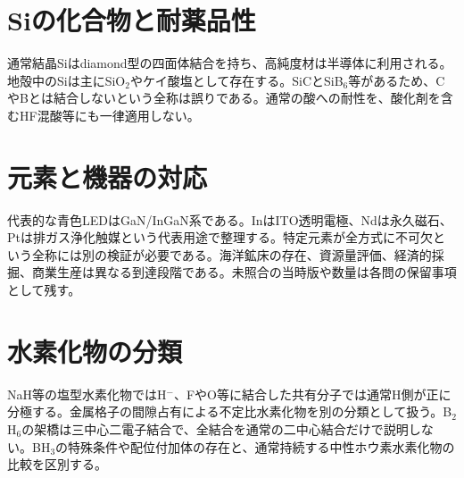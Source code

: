 \section{Siの化合物と耐薬品性}\label{theory:inorganic:silicon}
通常結晶Siはdiamond型の四面体結合を持ち、高純度材は半導体に利用される。地殻中のSiは主にSiO$_2$やケイ酸塩として存在する。SiCとSiB$_6$等があるため、CやBとは結合しないという全称は誤りである。通常の酸への耐性を、酸化剤を含むHF混酸等にも一律適用しない。\cite{inorganic_metalloid_ref,inorganic_sic,inorganic_sib6,inorganic_hf_etch}
\section{元素と機器の対応}\label{theory:inorganic:materials}
代表的な青色LEDはGaN/InGaN系である。InはITO透明電極、Ndは永久磁石、Ptは排ガス浄化触媒という代表用途で整理する。特定元素が全方式に不可欠という全称には別の検証が必要である。海洋鉱床の存在、資源量評価、経済的採掘、商業生産は異なる到達段階である。未照合の当時版や数量は各問の保留事項として残す。\cite{inorganic_blueled,inorganic_rareuses,inorganic_searesources}
\section{水素化物の分類}\label{theory:inorganic:hydride}
NaH等の塩型水素化物ではH$^-$、FやO等に結合した共有分子では通常H側が正に分極する。金属格子の間隙占有による不定比水素化物を別の分類として扱う。B$_2$H$_6$の架橋は三中心二電子結合で、全結合を通常の二中心結合だけで説明しない。BH$_3$の特殊条件や配位付加体の存在と、通常持続する中性ホウ素水素化物の比較を区別する。\cite{inorganic_hydrogen_ref,inorganic_metalloid_ref}


